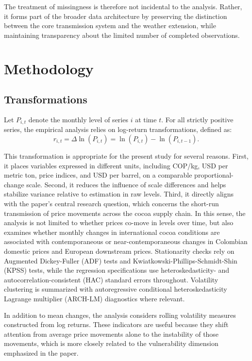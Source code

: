 \documentclass[11pt]{article}
\begin{document}
The treatment of missingness is therefore not incidental to the analysis. Rather, it forms part of the broader data architecture by preserving the distinction between the core transmission system and the weather extension, while maintaining transparency about the limited number of completed observations.

\section{Methodology}
\label{sec:methods}

\subsection{Transformations}

Let $P_{i,t}$ denote the monthly level of series $i$ at time $t$. For all strictly positive series, the empirical analysis relies on log-return transformations, defined as:
\begin{equation}
r_{i,t} = \Delta \ln(P_{i,t}) = \ln(P_{i,t}) - \ln(P_{i,t-1}).
\label{eq:logreturn}
\end{equation}

This transformation is appropriate for the present study for several reasons. First, it places variables expressed in different units, including COP/kg, USD per metric ton, price indices, and USD per barrel, on a comparable proportional-change scale. Second, it reduces the influence of scale differences and helps stabilize variance relative to estimation in raw levels. Third, it directly aligns with the paper's central research question, which concerns the short-run transmission of price movements across the cocoa supply chain. In this sense, the analysis is not limited to whether prices co-move in levels over time, but also examines whether monthly changes in international cocoa conditions are associated with contemporaneous or near-contemporaneous changes in Colombian domestic prices and European downstream prices. Stationarity checks rely on Augmented Dickey-Fuller (ADF) tests and Kwiatkowski-Phillips-Schmidt-Shin (KPSS) tests, while the regression specifications use heteroskedasticity- and autocorrelation-consistent (HAC) standard errors throughout. Volatility clustering is summarized with autoregressive conditional heteroskedasticity Lagrange multiplier (ARCH-LM) diagnostics where relevant.

In addition to mean changes, the analysis considers rolling volatility measures constructed from log returns. These indicators are useful because they shift attention from average price movements alone to the instability of those movements, which is more closely related to the vulnerability dimension emphasized in the paper.
\end{document}
